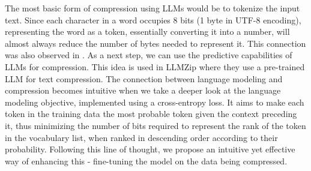 \documentclass[11pt]{article}
\begin{document}
The most basic form of compression using LLMs would be to tokenize the input text. Since each character in a word occupies 8 bits (1 byte in UTF-8 encoding), representing the word as a token, essentially converting it into a number, will almost always reduce the number of bytes needed to represent it. This connection was also observed in \citet{delétang2024language}. As a next step, we can use the predictive capabilities of LLMs for compression. This idea is used in LLMZip \cite{valmeekam2023llmzip} where they use a pre-trained LLM for text compression. The connection between language modeling and compression becomes intuitive when we take a deeper look at the language modeling objective, implemented using a cross-entropy loss. It aims to make each token in the training data the most probable token given the context preceding it, thus minimizing the number of bits required to represent the rank of the token in the vocabulary list, when ranked in descending order according to their probability.  Following this line of thought, we propose an intuitive yet effective way of enhancing this - fine-tuning the model on the data being compressed.



\end{document}
